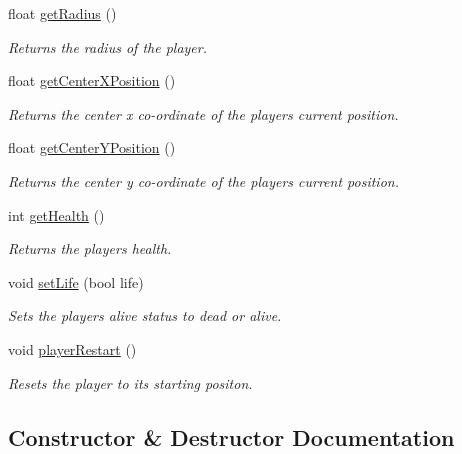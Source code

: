 \begin{DoxyCompactItemize}
float \hyperlink{class_player_logic_a2ca2c54d1e07bfc40a08b5c55403af3a}{get\+Radius} ()
\begin{DoxyCompactList}\small\item\em Returns the radius of the player. \end{DoxyCompactList}\item 
float \hyperlink{class_player_logic_a6bdec8d007701c16a3cbb87e7fdfe0e6}{get\+Center\+X\+Position} ()
\begin{DoxyCompactList}\small\item\em Returns the center x co-\/ordinate of the player\textquotesingle{}s current position. \end{DoxyCompactList}\item 
float \hyperlink{class_player_logic_ad7b9048aee0c7b58443055f37f871537}{get\+Center\+Y\+Position} ()
\begin{DoxyCompactList}\small\item\em Returns the center y co-\/ordinate of the player\textquotesingle{}s current position. \end{DoxyCompactList}\item 
int \hyperlink{class_player_logic_aa13b870627a1d38cd1c633ac8012e5af}{get\+Health} ()
\begin{DoxyCompactList}\small\item\em Returns the players health. \end{DoxyCompactList}\item 
void \hyperlink{class_player_logic_a3139e107a0eb76e7307f8657818b3007}{set\+Life} (bool life)
\begin{DoxyCompactList}\small\item\em Sets the players alive status to dead or alive. \end{DoxyCompactList}\item 
void \hyperlink{class_player_logic_aaaf0e8356e5af9753015960be7727724}{player\+Restart} ()
\begin{DoxyCompactList}\small\item\em Resets the player to its starting positon. \end{DoxyCompactList}\end{DoxyCompactItemize}


\subsection{Constructor \& Destructor Documentation}
\mbox{\label{class_player_logic_aa14c9bac512df3d01ea4db0224e82405}} 

